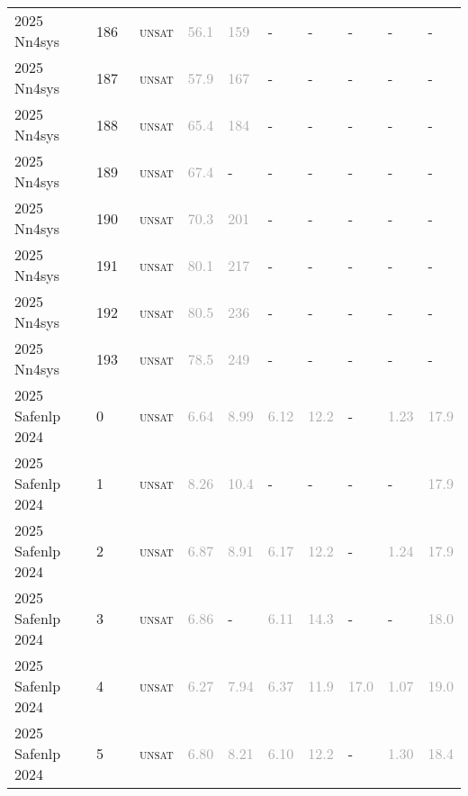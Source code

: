 \begin{center}
{\begin{longtable}{@{}llllllllll@{}}
2025 Nn4sys & 186 & ~\textsc{unsat} & \textcolor{darkgray}{56.1} & \textcolor{darkgray}{159} & - & - & - & - & - \\
2025 Nn4sys & 187 & ~\textsc{unsat} & \textcolor{darkgray}{57.9} & \textcolor{darkgray}{167} & - & - & - & - & - \\
2025 Nn4sys & 188 & ~\textsc{unsat} & \textcolor{darkgray}{65.4} & \textcolor{darkgray}{184} & - & - & - & - & - \\
2025 Nn4sys & 189 & ~\textsc{unsat} & \textcolor{darkgray}{67.4} & - & - & - & - & - & - \\
2025 Nn4sys & 190 & ~\textsc{unsat} & \textcolor{darkgray}{70.3} & \textcolor{darkgray}{201} & - & - & - & - & - \\
2025 Nn4sys & 191 & ~\textsc{unsat} & \textcolor{darkgray}{80.1} & \textcolor{darkgray}{217} & - & - & - & - & - \\
2025 Nn4sys & 192 & ~\textsc{unsat} & \textcolor{darkgray}{80.5} & \textcolor{darkgray}{236} & - & - & - & - & - \\
2025 Nn4sys & 193 & ~\textsc{unsat} & \textcolor{darkgray}{78.5} & \textcolor{darkgray}{249} & - & - & - & - & - \\
\midrule
2025 Safenlp 2024 & 0 & ~\textsc{unsat} & \textcolor{darkgray}{6.64} & \textcolor{darkgray}{8.99} & \textcolor{darkgray}{6.12} & \textcolor{darkgray}{12.2} & - & \textcolor{darkgray}{1.23} & \textcolor{darkgray}{17.9} \\
2025 Safenlp 2024 & 1 & ~\textsc{unsat} & \textcolor{darkgray}{8.26} & \textcolor{darkgray}{10.4} & - & - & - & - & \textcolor{darkgray}{17.9} \\
2025 Safenlp 2024 & 2 & ~\textsc{unsat} & \textcolor{darkgray}{6.87} & \textcolor{darkgray}{8.91} & \textcolor{darkgray}{6.17} & \textcolor{darkgray}{12.2} & - & \textcolor{darkgray}{1.24} & \textcolor{darkgray}{17.9} \\
2025 Safenlp 2024 & 3 & ~\textsc{unsat} & \textcolor{darkgray}{6.86} & - & \textcolor{darkgray}{6.11} & \textcolor{darkgray}{14.3} & - & - & \textcolor{darkgray}{18.0} \\
2025 Safenlp 2024 & 4 & ~\textsc{unsat} & \textcolor{darkgray}{6.27} & \textcolor{darkgray}{7.94} & \textcolor{darkgray}{6.37} & \textcolor{darkgray}{11.9} & \textcolor{darkgray}{17.0} & \textcolor{darkgray}{1.07} & \textcolor{darkgray}{19.0} \\
2025 Safenlp 2024 & 5 & ~\textsc{unsat} & \textcolor{darkgray}{6.80} & \textcolor{darkgray}{8.21} & \textcolor{darkgray}{6.10} & \textcolor{darkgray}{12.2} & - & \textcolor{darkgray}{1.30} & \textcolor{darkgray}{18.4} \\

\end{longtable}}
\end{center}

